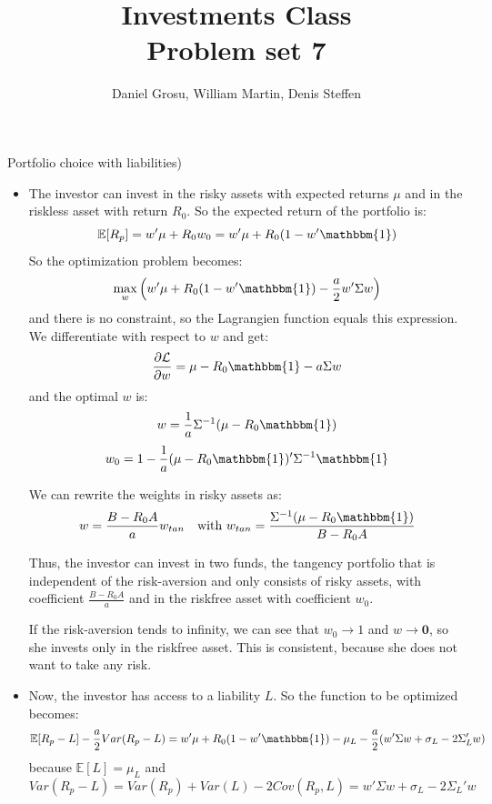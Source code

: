 \documentclass[10pt]{article}
\newcommand{\Ebb}{\mathbb{E}}
\renewcommand{\mathbf}{\mathbold}
\newenvironment{exercise}[2][Exercise]{\begin{trivlist}
  \item[\hskip \labelsep {\bfseries #1}\hskip \labelsep {\bfseries #2.}]}{\end{trivlist}}
\begin{document}
  \pagecolor{solar}
	
  \renewcommand{\qedsymbol}{\smiley}
	\title{Investments Class \\ Problem set 7}
	\author{Daniel Grosu, William Martin, Denis Steffen}
		
\maketitle

\begin{exercise}{1}(Portfolio choice with liabilities)
  \begin{itemize}
    \item The investor can invest in the risky assets with expected returns $\mu$ and in the riskless asset with return $R_0$. So the expected return of the portfolio is: $$ \Ebb[R_p] = w'\mu + R_0w_0 = w'\mu + R_0(1-w'\mathbbm{1})$$
    So the optimization problem becomes: 
    $$ \max_w \left(w'\mu + R_0(1-w'\mathbbm{1}) -\frac{a}{2}w'\Sigma w\right)$$ and there is no constraint, so the Lagrangien function equals this expression. 
    \\
    We differentiate with respect to $w$ and get:
    $$ \frac{\partial \mathcal{L}}{\partial w} = \mu - R_0\mathbbm{1} - a \Sigma w $$ and the optimal $w$ is: 
    $$ w = \frac{1}{a}\Sigma^{-1}(\mu- R_0\mathbbm{1})$$
    $$ w_0 = 1 - \frac{1}{a}(\mu- R_0\mathbbm{1})'\Sigma^{-1}\mathbbm{1}$$

    We can rewrite the weights in risky assets as: 
    $$ w = \frac{B-R_0A}{a}w_{tan} \quad \text{with } w_{tan} = \frac{\Sigma^{-1}(\mu-R_0\mathbbm{1})}{B-R_0A}$$
    
    Thus, the investor can invest in two funds, the tangency portfolio that is independent of the risk-aversion and only consists of risky assets, with coefficient $ \frac{B-R_0A}{a}$ and in the riskfree asset with coefficient $w_0$. 

    If the risk-aversion tends to infinity, we can see that $w_0 \rightarrow 1$ and $w \rightarrow \mathbf{0} $, so she invests only in the riskfree asset. This is consistent, because she does not want to take any risk. 
    \item Now, the investor has access to a liability $L$. So the function to be optimized becomes: 
    $$ \Ebb[R_p - L] - \frac{a}{2}Var(R_p-L) = w'\mu +R_0(1-w'\mathbbm{1}) - \mu_L - \frac{a}{2}(w'\Sigma w + \sigma_L - 2\Sigma_L'w)$$ because $\Ebb[L] = \mu_L$ and  $$Var(R_p - L) = Var(R_p) + Var(L) - 2Cov(R_p,L)  = w'\Sigma w + \sigma_L - 2\Sigma_L'w$$


\end{itemize}
\end{exercise}
\end{document}
